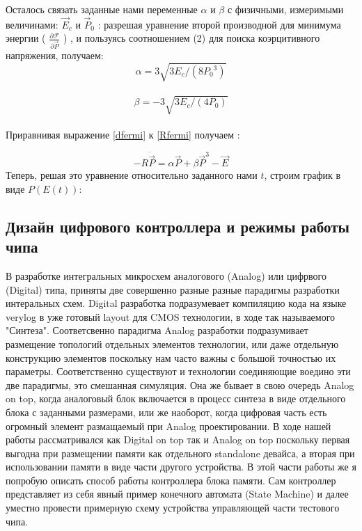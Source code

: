 \documentclass[a4paper,12pt]{article} %
\begin{document}
Осталось связать заданные нами переменные $\alpha $ и   $\beta $ с физичными, измеримыми величинами: $ \vec{E}_c $ и
		  $\vec{P}_0 $ :
		разрешая уравнение второй производной для минимума энергии ( $ \frac{\partial\mathcal{F} }{\partial \vec{P}} $ ) , и пользуясь соотношением (2) для поиска коэрцитивного напряжения, получаем:\\
		$$\alpha = 3\sqrt{3E_c/(8{P_0}^3)}$$\\
	$$ \beta = -3\sqrt{3E_c/(4P_0)}$$\\
	
	
	
	
	  Приравнивая выражение  \eqref{dfermi} к \eqref{Rfermi} получаем :
  
  \begin{equation}
  -R \dot{\vec{P}}  = \alpha \vec{P} + \beta \vec{P}^3 - \vec{E}
  \end{equation}
  Теперь, решая это уравнение относительно заданного нами  $ t $, строим график в виде $P (E(t))$:




\subsection{Дизайн цифрового контроллера и режимы работы чипа}
\label{subsec:digital}

В разработке интегральных микросхем аналогового (Analog) или цифрвого (Digital) типа, приняты две совершенно разные разные парадигмы разработки интеральных схем. Digital разработка подразумевает компиляцию кода на языке verylog в уже готовый layout для CMOS технологии, в ходе так называемого "Синтеза". Соответсвенно парадигма Analog разработки подразумивает размещение топологий отдельных элементов технологии, или даже отдельную конструкцию элементов поскольку нам часто важны с большой точностью их параметры. Соответственно существуют и технологии соединяющие воедино эти две парадигмы, это смешанная симуляция. Она же бывает в свою очередь Analog on top, когда аналоговый блок включается в процесс синтеза в виде отдельного блока с заданными размерами, или же наоборот, когда цифровая часть есть огромный элемент размащаемый при Analog проектировании. В ходе нашей работы рассматривался как Digital on top так и Analog on top поскольку первая выгодна при размещении памяти как отдельного standalone девайса, а вторая при использовании памяти в виде части другого устройства. В этой части работы же я попробую описать способ работы контроллера блока памяти. Сам контроллер представляет из себя явный пример конечного автомата (State Machine) и далее уместно провести примерную схему устройства управляющей части тестового чипа.
\end{document}
